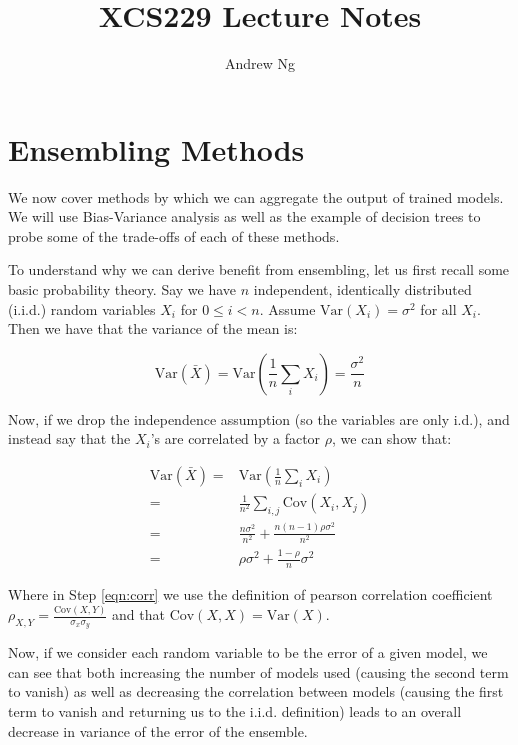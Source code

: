 \documentclass{article}
\begin{document}
\title{XCS229 Lecture Notes}
\author{Andrew Ng}
\date{}
\maketitle


\part*{Ensembling Methods}

We now cover methods by which we can aggregate the output of trained models.  We will use Bias-Variance analysis as well as the example of decision trees to probe some of the trade-offs of each of these methods.

To understand why we can derive benefit from ensembling, let us first recall some basic probability theory.  Say we have $n$ independent, identically distributed (i.i.d.) random variables $X_i$ for $0 \leq i < n$.  Assume $\mathrm{Var}(X_i) = \sigma^2$ for all $X_i$.  Then we have that the variance of the mean is:

$$\mathrm{Var}(\bar{X}) = \mathrm{Var}(\frac{1}{n}\sum_i X_i) = \frac{\sigma^2}{n}$$

Now, if we drop the independence assumption (so the variables are only i.d.), and instead say that the $X_i$'s are correlated by a factor $\rho$, we can show that:

\begin{align}
\mathrm{Var}(\bar{X}) =&  \mathrm{Var}(\frac{1}{n}\sum_i X_i) \\ 
=&\frac{1}{n^2} \sum_{i, j} \mathrm{Cov}(X_i, X_j) \\
=&\frac{n \sigma^2}{n^2} + \frac{n (n - 1) \rho \sigma^2}{n^2} \label{eqn:corr}\\
=&\rho \sigma^2 + \frac{1 - \rho}{n} \sigma^2 \label{eqn:final}
\end{align}

Where in Step \ref{eqn:corr} we use the definition of pearson correlation coefficient $\rho_{X, Y} = \frac{\mathrm{Cov}(X, Y)}{\sigma_x \sigma_y}$ and that $\mathrm{Cov}(X, X) = \mathrm{Var}(X)$.  


Now, if we consider each random variable to be the error of a given model, we can see that both increasing the number of models used (causing the second term to vanish) as well as decreasing the correlation between models (causing the first term to vanish and returning us to the i.i.d. definition) leads to an overall decrease in variance of the error of the ensemble.  
\end{document}
